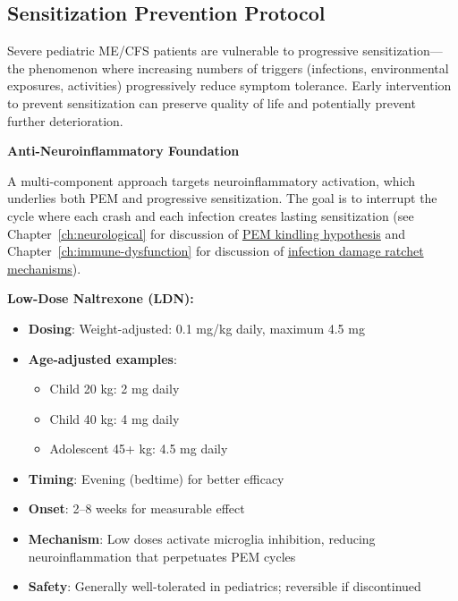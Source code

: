 \subsection{Sensitization Prevention Protocol}
\label{subsec:ped-severe-sensitization}

Severe pediatric ME/CFS patients are vulnerable to progressive sensitization---the phenomenon where increasing numbers of triggers (infections, environmental exposures, activities) progressively reduce symptom tolerance. Early intervention to prevent sensitization can preserve quality of life and potentially prevent further deterioration.

\begin{protocol}
\label{protocol:ped-sensitization-prevention}

\textbf{Anti-Neuroinflammatory Foundation}

A multi-component approach targets neuroinflammatory activation, which underlies both PEM and progressive sensitization. The goal is to interrupt the cycle where each crash and each infection creates lasting sensitization (see Chapter~\ref{ch:neurological} for discussion of \hyperref[hyp:pem-kindling-sensitization]{PEM kindling hypothesis} and Chapter~\ref{ch:immune-dysfunction} for discussion of \hyperref[spec:infection-damage-ratchet]{infection damage ratchet mechanisms}).

\textbf{Low-Dose Naltrexone (LDN):}
\begin{itemize}
    \item \textbf{Dosing}: Weight-adjusted: 0.1 mg/kg daily, maximum 4.5 mg
    \item \textbf{Age-adjusted examples}:
    \begin{itemize}
        \item Child 20 kg: 2 mg daily
        \item Child 40 kg: 4 mg daily
        \item Adolescent 45+ kg: 4.5 mg daily
    \end{itemize}
    \item \textbf{Timing}: Evening (bedtime) for better efficacy
    \item \textbf{Onset}: 2--8 weeks for measurable effect
    \item \textbf{Mechanism}: Low doses activate microglia inhibition, reducing neuroinflammation that perpetuates PEM cycles
    \item \textbf{Safety}: Generally well-tolerated in pediatrics; reversible if discontinued
\end{itemize}


\end{protocol}
